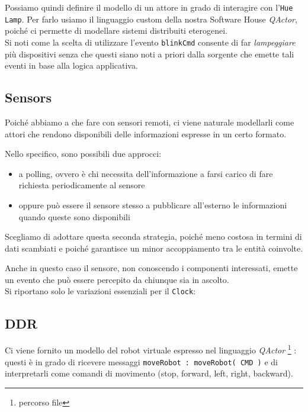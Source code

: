 \documentclass{../llncs}
\newcommand{\codescript}[1]{{\scriptsize{\texttt{#1}}}\xspace}
\newcommand{\qa}{\textsf{\textit{QActor}}}
\begin{document}
Possiamo quindi definire il modello di un attore in grado di interagire con l'\texttt{Hue Lamp}. Per farlo usiamo il linguaggio custom della nostra Software House \qa, poiché ci permette di modellare sistemi distribuiti eterogenei.\\



Si noti come la scelta di utilizzare l'evento \codescript{blinkCmd} consente di far \textit{lampeggiare} più dispositivi senza che questi siano noti a priori dalla sorgente che emette tali eventi in base alla logica applicativa.

\subsection{Sensors}
Poiché abbiamo a che fare con sensori remoti, ci viene naturale modellarli come attori che rendono disponibili delle informazioni espresse in un certo formato.

Nello specifico, sono possibili due approcci:
\begin{itemize}
\item a polling, ovvero è chi necessita dell'informazione a farsi carico di fare richiesta periodicamente al sensore
\item oppure può essere il sensore stesso a pubblicare all'esterno le informazioni quando queste sono disponibili 
\end{itemize}
Scegliamo di adottare questa seconda strategia, poiché meno costosa in termini di dati scambiati e poiché garantisce un minor accoppiamento tra le entità coinvolte.

Anche in questo caso il sensore, non conoscendo i componenti interessati, emette un evento che può essere percepito da chiunque sia in ascolto.\\



Si riportano solo le variazioni essenziali per il \texttt{Clock}:



\subsection{DDR}
Ci viene fornito un modello del robot virtuale espresso nel linguaggio \qa
\footnote{percorso file}
: questi è in grado di ricevere messaggi \codescript{moveRobot : moveRobot( CMD )} e di interpretarli come comandi di movimento (stop, forward, left, right, backward).
\end{document}
